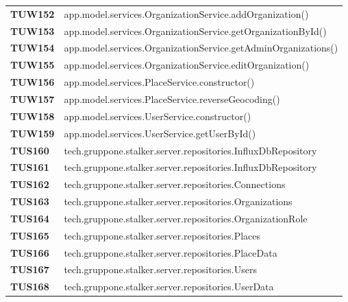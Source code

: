 \documentclass[../../piano-di-qualifica.tex]{subfiles}
\begin{document}
\begin{longtable}[H]{>{\centering\bfseries}m{3cm} >{}m{13cm}}
  TUW152             & app.model.services.OrganizationService.addOrganization\@()                                              \\


  TUW153             & app.model.services.OrganizationService.getOrganizationById\@()                                          \\

  TUW154             & app.model.services.OrganizationService.getAdminOrganizations\@()                                        \\

  TUW155             & app.model.services.OrganizationService.editOrganization\@()                                             \\



  TUW156             & app.model.services.PlaceService.constructor\@()                                                         \\

  TUW157             & app.model.services.PlaceService.reverseGeocoding\@()                                                    \\


  TUW158             & app.model.services.UserService.constructor\@()                                                          \\

  TUW159             & app.model.services.UserService.getUserById\@()                                                          \\


  TUS160 & tech.gruppone.stalker.server.repositories.InfluxDbRepository \\
  TUS161 & tech.gruppone.stalker.server.repositories.InfluxDbRepository \\


  TUS162 & tech.gruppone.stalker.server.repositories.Connections \\
  TUS163 & tech.gruppone.stalker.server.repositories.Organizations \\
  TUS164 & tech.gruppone.stalker.server.repositories.OrganizationRole \\
  TUS165 & tech.gruppone.stalker.server.repositories.Places \\
  TUS166 & tech.gruppone.stalker.server.repositories.PlaceData \\
  TUS167 & tech.gruppone.stalker.server.repositories.Users \\
  TUS168 & tech.gruppone.stalker.server.repositories.UserData \\


\end{longtable}
\end{document}
